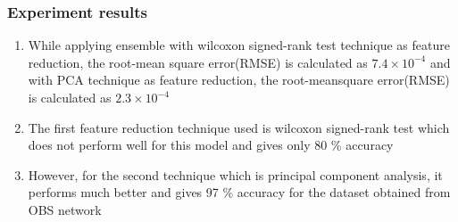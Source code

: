 \documentclass{beamer}
\begin{document}
\begin{frame}[fragile]
\frametitle{Experiment results}
\begin{block}{}
\begin{enumerate}
       \item While applying ensemble with wilcoxon
signed-rank test technique as feature reduction, the root-mean square error(RMSE) is calculated as \(7.4 \times 10^{-4}\) and with  PCA technique as feature reduction, the root-meansquare error(RMSE) is calculated as \(2.3 \times 10^{-4}\)
\item  The first feature reduction technique used is wilcoxon signed-rank test which does not perform well for this model and gives only 80 \% accuracy
\item However, for the second technique which is principal component analysis, it performs
much better and gives 97 \% accuracy for the dataset obtained from OBS network
   \end{enumerate}
   \end{block}
   
\end{frame}
\end{document}
